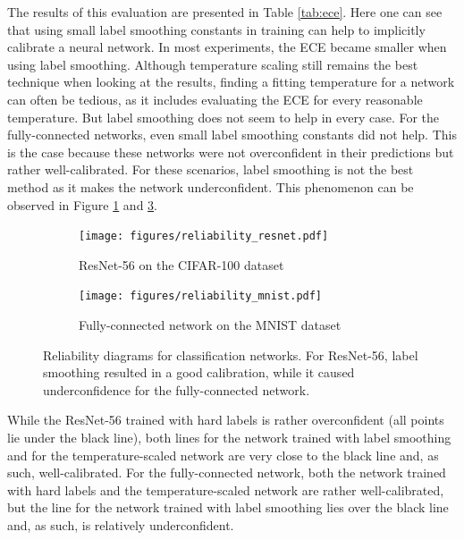 The results of this evaluation are presented in Table \ref{tab:ece}. Here one can see that using small label smoothing constants in training can help to implicitly calibrate a neural network. In most experiments, the ECE became smaller when using label smoothing. Although temperature scaling still remains the best technique when looking at the results, finding a fitting temperature for a network can often be tedious, as it includes evaluating the ECE for every reasonable temperature. But label smoothing does not seem to help in every case. For the fully-connected networks, even small label smoothing constants did not help. This is the case because these networks were not overconfident in their predictions but rather well-calibrated. For these scenarios, label smoothing is not the best method as it makes the network underconfident. This phenomenon can be observed in Figure \ref{fig:acc_conf_resnet56} and \ref{fig:acc_conf_mnist}. 

\begin{figure}[ht]
    \begin{subfigure}{.49\textwidth}
    \centering
    \texttt{[image: figures/reliability\_resnet.pdf]}
    \caption{ResNet-56 on the CIFAR-100 dataset}
    \label{fig:acc_conf_resnet56}
\end{subfigure}
\hfill
\begin{subfigure}{.49\textwidth}
    \centering
    \texttt{[image: figures/reliability\_mnist.pdf]}
    \caption{Fully-connected network on the MNIST dataset}
    \label{fig:acc_conf_mnist}
\end{subfigure}
\caption{Reliability diagrams for classification networks. For ResNet-56, label smoothing resulted in a good calibration, while it caused underconfidence for the fully-connected network.}
\end{figure}

While the ResNet-56 trained with hard labels is rather overconfident (all points lie under the black line), both lines for the network trained with label smoothing and for the temperature-scaled network are very close to the black line and, as such, well-calibrated. For the fully-connected network, both the network trained with hard labels and the temperature-scaled network are rather well-calibrated, but the line for the network trained with label smoothing lies over the black line and, as such, is relatively underconfident.

